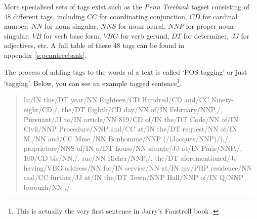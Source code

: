 More specialised sets of tags exist such as the \textit{Penn Treebank} tagset \autocite{Marcus1993} consisting of 48 different tags, including $CC$ for coordinating conjunction, $CD$ for cardinal number, $NN$ for noun singular, $NNS$ for noun plural, $NNP$ for proper noun singular, $VB$ for verb base form, $VBG$ for verb gerund, $DT$ for determiner, $JJ$ for adjectives, etc. A full table of these 48 tags can be found in appendix~\ref{s:penntreebank}.

The process of adding tags to the words of a text is called `\ac{POS} tagging' or just `tagging'. Below, you can see an example tagged sentence\footnote{This is actually the very first sentence in Jarry's Faustroll book \autocite*{Jarry1996}.}.

\begin{quote}
  In\slash{}IN this\slash{}DT year\slash{}NN Eighteen\slash{}CD Hundred\slash{}CD and\slash{}CC Ninety-eight\slash{}CD,\slash{}, the\slash{}DT Eighth\slash{}CD day\slash{}NN of\slash{}IN February\slash{}NNP,\slash{}, Pursuant\slash{}JJ to\slash{}IN article\slash{}NN 819\slash{}CD of\slash{}IN the\slash{}DT Code\slash{}NN of\slash{}IN Civil\slash{}NNP Procedure\slash{}NNP and\slash{}CC at\slash{}IN the\slash{}DT request\slash{}NN of\slash{}IN M.\slash{}NN and\slash{}CC Mme.\slash{}NN Bonhomme\slash{}NNP (\slash{}(Jacques\slash{}NNP)\slash{}),\slash{}, proprietors\slash{}NNS of\slash{}IN a\slash{}DT house\slash{}NN situate\slash{}JJ at\slash{}IN Paris\slash{}NNP,\slash{}, 100\slash{}CD bis\slash{}NN,\slash{}, rue\slash{}NN Richer\slash{}NNP,\slash{}, the\slash{}DT aforementioned\slash{}JJ having\slash{}VBG address\slash{}NN for\slash{}IN service\slash{}NN at\slash{}IN my\slash{}PRP residence\slash{}NN and\slash{}CC further\slash{}JJ at\slash{}IN the\slash{}DT Town\slash{}NNP Hall\slash{}NNP of\slash{}IN Q\slash{}NNP borough\slash{}NN .\slash{}.
\end{quote}




